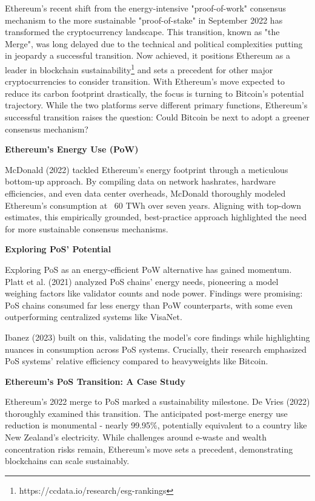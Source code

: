 \documentclass[11pt]{report}
\begin{document}
Ethereum's recent shift from the energy-intensive "proof-of-work" consensus mechanism to the more sustainable "proof-of-stake" in September 2022 has transformed the cryptocurrency landscape. This transition, known as "the Merge", was long delayed due to the technical and political complexities putting in jeopardy a successful transition\cite{bloombergnewsEthereumMergeYour2022}. Now achieved, it positions Ethereum as a leader in blockchain sustainability\footnote{https://ccdata.io/research/esg-rankings} and sets a precedent for other major cryptocurrencies to consider transition. With Ethereum's move expected to reduce its carbon footprint drastically, the focus is turning to Bitcoin's potential trajectory. While the two platforms serve different primary functions, Ethereum's successful transition raises the question: Could Bitcoin be next to adopt a greener consensus mechanism?


\textbf{Ethereum's Energy Use (PoW)}

McDonald (2022)\cite{mcdonaldEthereumEmissionsBottomup2022} tackled Ethereum's energy footprint through a meticulous bottom-up approach. By compiling data on network hashrates, hardware efficiencies, and even data center overheads, McDonald thoroughly modeled Ethereum's consumption at ~60 TWh over seven years. Aligning with top-down estimates, this empirically grounded, best-practice approach highlighted the need for more sustainable consensus mechanisms.

\textbf{Exploring PoS' Potential}

Exploring PoS as an energy-efficient PoW alternative has gained momentum. Platt et al. (2021)\cite{plattEnergyFootprintBlockchain2021} analyzed PoS chains' energy needs, pioneering a model weighing factors like validator counts and node power. Findings were promising: PoS chains consumed far less energy than PoW counterparts, with some even outperforming centralized systems like VisaNet.

Ibanez (2023) built on this, validating the model's core findings while highlighting nuances in consumption across PoS systems. Crucially, their research emphasized PoS systems' relative efficiency compared to heavyweights like Bitcoin.

\textbf{Ethereum's PoS Transition: A Case Study}

Ethereum's 2022 merge to PoS marked a sustainability milestone. De Vries (2022)\cite{devriesCryptocurrenciesRoadSustainability2022} thoroughly examined this transition. The anticipated post-merge energy use reduction is monumental - nearly 99.95\%, potentially equivalent to a country like New Zealand's electricity. While challenges around e-waste and wealth concentration risks remain, Ethereum's move sets a precedent, demonstrating blockchains can scale sustainably.
\end{document}
